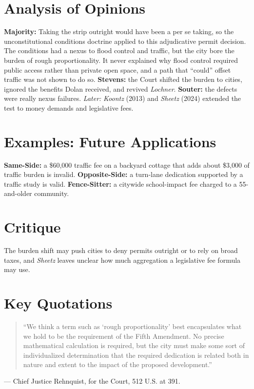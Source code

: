 \documentclass[12pt]{article}
\begin{document}
\section{Analysis of Opinions}
\textbf{Majority:} Taking the strip outright would have been a per se taking, so the unconstitutional conditions doctrine applied to this adjudicative permit decision. The conditions had a nexus to flood control and traffic, but the city bore the burden of rough proportionality. It never explained why flood control required public access rather than private open space, and a path that ``could'' offset traffic was not shown to do so. \textbf{Stevens:} the Court shifted the burden to cities, ignored the benefits Dolan received, and revived \textit{Lochner}. \textbf{Souter:} the defects were really nexus failures. \emph{Later:} \textit{Koontz} (2013) and \textit{Sheetz} (2024) extended the test to money demands and legislative fees.

\section{Examples: Future Applications}
\textbf{Same-Side:} a \$60,000 traffic fee on a backyard cottage that adds about \$3,000 of traffic burden is invalid. \textbf{Opposite-Side:} a turn-lane dedication supported by a traffic study is valid. \textbf{Fence-Sitter:} a citywide school-impact fee charged to a 55-and-older community.

\section{Critique}
The burden shift may push cities to deny permits outright or to rely on broad taxes, and \textit{Sheetz} leaves unclear how much aggregation a legislative fee formula may use.

\section{Key Quotations}
\begin{quote}
``We think a term such as `rough proportionality' best encapsulates what we hold to be the requirement of the Fifth Amendment. No precise mathematical calculation is required, but the city must make some sort of individualized determination that the required dedication is related both in nature and extent to the impact of the proposed development.''
\end{quote}
\noindent --- Chief Justice Rehnquist, for the Court, 512 U.S. at 391.
\end{document}
